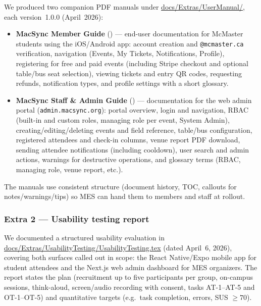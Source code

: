 \documentclass{article}
\begin{document}
We produced two companion PDF manuals under
\url{docs/Extras/UserManual/},
each version~1.0.0 (April~2026):
\begin{itemize}
  \item \textbf{MacSync Member Guide} () --- end-user
        documentation for McMaster students using the iOS/Android app: account
        creation and \texttt{@mcmaster.ca} verification, navigation (Events, My
        Tickets, Notifications, Profile), registering for free and paid events
        (including Stripe checkout and optional table/bus seat selection), viewing
        tickets and entry QR codes, requesting refunds, notification types, and
        profile settings with a short glossary.
  \item \textbf{MacSync Staff \& Admin Guide} () ---
        documentation for the web admin portal (\texttt{admin.macsync.org}):
        portal overview, login and navigation, RBAC (built-in and custom roles,
        managing role per event, System Admin), creating/editing/deleting events
        and field reference, table/bus configuration, registered attendees and
        check-in columns, venue report PDF download, sending attendee
        notifications (including cooldown), user search and admin actions,
        warnings for destructive operations, and glossary terms (RBAC, managing
        role, venue report, etc.).
\end{itemize}
The manuals use consistent structure (document history, TOC, callouts for
notes/warnings/tips) so MES can hand them to members and staff at rollout.

\subsubsection*{Extra 2 --- Usability testing report}

We documented a structured usability evaluation in
\url{docs/Extras/UsabilityTesting/UsabilityTesting.tex} (dated April~6,
2026), covering both surfaces called out in scope: the React Native/Expo mobile
app for student attendees and the Next.js web admin dashboard for MES
organizers. The report states the plan (recruitment up to five participants per
group, on-campus sessions, think-aloud, screen/audio recording with consent,
tasks AT-1--AT-5 and OT-1--OT-5) and quantitative targets (e.g.\ task completion,
errors, SUS $\geq 70$).
\end{document}
